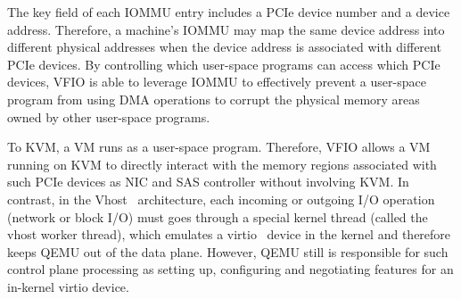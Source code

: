 The key field of each IOMMU entry includes a PCIe device number and a device address.
Therefore, a machine's IOMMU may map the same device address into different physical addresses when the device address is associated with different PCIe devices.
By controlling which user-space programs can access which PCIe devices, VFIO is able to leverage IOMMU to effectively prevent a user-space program 
from using DMA operations to corrupt the physical memory areas owned by other user-space programs.

To KVM, a VM runs as a user-space program.
Therefore, VFIO allows a VM running on KVM to directly interact with the memory regions associated with 
such PCIe devices as NIC and SAS controller without involving KVM.
In contrast, in the Vhost~\cite{vhost-net} architecture, each incoming or outgoing I/O operation (network or block I/O) must goes through 
a special kernel thread (called the vhost worker thread), which emulates a virtio~\cite{russell:2008} device in the kernel and therefore keeps QEMU out of the data plane.
However, QEMU still is responsible for such control plane processing as setting up, configuring and negotiating features for an in-kernel virtio device.  



